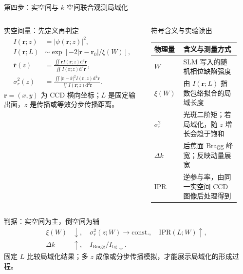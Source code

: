 \documentclass[UTF8,fontset=none,aspectratio=169,10pt]{ctexbeamer}
\newcommand{\dd}{\mathrm{d}}
\newcommand{\rb}{\mathbf{r}}
\begin{document}
\begin{frame}[t]{第四步：实空间与 $k$ 空间联合观测局域化}
\footnotesize
\setlength{\abovedisplayskip}{3pt}
\setlength{\belowdisplayskip}{3pt}
\begin{columns}[T,onlytextwidth]
\begin{block}{实空间量：先定义再判定}
\[
\begin{aligned}
I(\rb;z)&=|\psi(\rb;z)|^2,\\
I(\rb;L)&\sim
\exp[-2|\rb-\rb_0|/\xi(W)],\\
\bar{\rb}(z)&=
\frac{\iint \rb I(\rb;z)\dd^2\rb}{\iint I(\rb;z)\dd^2\rb},\\
\sigma_r^2(z)&=
\frac{\iint |\rb-\bar{\rb}|^2 I(\rb;z)\dd^2\rb}
{\iint I(\rb;z)\dd^2\rb}.
\end{aligned}
\]
$\rb=(x,y)$ 为 CCD 横向坐标；$L$ 是固定输出面，$z$ 是传播或等效分步传播距离。
\end{block}

\begin{block}{符号含义与实验读出}
\begin{center}
\scriptsize
\setlength{\tabcolsep}{2pt}
\begin{tabular}{>{\raggedright}p{0.24\linewidth}>{\raggedright\arraybackslash}p{0.63\linewidth}}
\toprule
物理量 & 含义与测量方式\\
\midrule
$W$ & SLM 写入的随机相位缺陷强度\\
$\xi(W)$ & 由 $I(\rb;L)$ 指数包络拟合的局域长度\\
$\sigma_r^2$ & 光斑二阶矩；若局域化，随 $z$ 增长会趋于饱和\\
$\Delta k$ & 后焦面 Bragg 峰宽；反映动量展宽\\
IPR & 逆参与率，由同一实空间 CCD 图像后处理得到\\
\bottomrule
\end{tabular}
\end{center}
\end{block}
\end{columns}

\vspace{-0.1em}
\begin{alertblock}{判据：实空间为主，倒空间为辅}
\[
\begin{aligned}
\xi(W)&\downarrow,\quad \sigma_r^2(z;W)\to\mathrm{const.},\quad \mathrm{IPR}(L;W)\uparrow,\\
\Delta k&\uparrow,\quad I_{\mathrm{Bragg}}/I_{\mathrm{bg}}\downarrow .
\end{aligned}
\]
固定 $L$ 比较局域化结果；多 $z$ 成像或分步传播模拟，才能展示局域化的形成过程。
\end{alertblock}
\end{frame}
\end{document}

